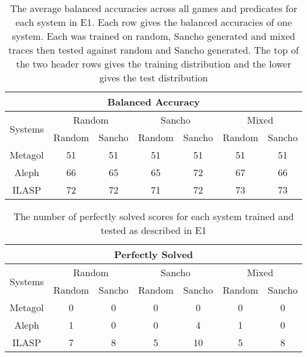 \begin{table}[]
	\begin{tabular}{|c|c|c|c|c|c|c|}
		\hline
		\multicolumn{7}{|c|}{Balanced Accuracy}                                                                           \\ \hline
		\multirow{2}{*}{Systems} & \multicolumn{2}{c|}{Random} & \multicolumn{2}{c|}{Sancho} & \multicolumn{2}{c|}{Mixed} \\ \cline{2-7}
		& Random       & Sancho       & Random       & Sancho       & Random       & Sancho      \\ \hline
		Metagol                  & 51           & 51           & 51           & 51           & 51           & 51          \\ \hline
		Aleph                    & 66           & 65           & 65           & 72           & 67           & 66          \\ \hline
		ILASP                    & 72           & 72           & 71           & 72           & 73           & 73          \\ \hline
	\end{tabular}
	\caption{The average balanced accuracies across all games and predicates for each system in E1. Each row gives the balanced accuracies of one system. Each was trained on random, Sancho generated and mixed traces then tested against random and Sancho generated. The top of the two header rows gives the training distribution and the lower gives the test distribution}
	\label{tab:E1-BA}
\end{table}


\begin{table}[]
	\begin{tabular}{|c|c|c|c|c|c|c|}
		\hline
		\multicolumn{7}{|c|}{Perfectly Solved}                                                                            \\ \hline
		\multirow{2}{*}{Systems} & \multicolumn{2}{c|}{Random} & \multicolumn{2}{c|}{Sancho} & \multicolumn{2}{c|}{Mixed} \\ \cline{2-7}
		& Random       & Sancho       & Random       & Sancho       & Random       & Sancho      \\ \hline
		Metagol                  & 0            & 0            & 0            & 0            & 0            & 0           \\ \hline
		Aleph                    & 1            & 0            & 0            & 4            & 1            & 0           \\ \hline
		ILASP                    & 7            & 8            & 5            & 10           & 5            & 8           \\ \hline
	\end{tabular}
	\caption{The number of perfectly solved scores for each system trained and tested as described in E1}
	\label{tab:E1-P}
\end{table}

